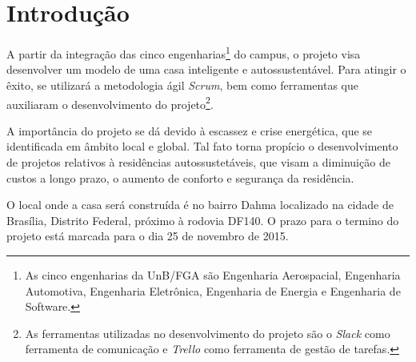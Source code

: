 \chapter[Introdução]{Introdução}

	A partir da integração das cinco engenharias\footnote{As cinco engenharias da UnB/FGA são Engenharia Aerospacial, Engenharia Automotiva, Engenharia Eletrônica, Engenharia de Energia e Engenharia de Software.} do campus, o projeto visa desenvolver um modelo de uma casa inteligente e autossustentável. Para atingir o êxito, se utilizará a metodologia ágil \textit{Scrum}, bem como ferramentas que auxiliaram o desenvolvimento do projeto\footnote{As ferramentas utilizadas no desenvolvimento do projeto são o \textit{Slack} como ferramenta de comunicação e \textit{Trello} como ferramenta de gestão de tarefas.}.

	A importância do projeto se dá devido à escassez e crise energética, que se identificada em âmbito local e global. Tal fato torna propício o desenvolvimento de projetos relativos à residências autossustetáveis, que visam a diminuição de custos a longo prazo, o aumento de conforto e segurança da residência.

	O local onde a casa será construída é no bairro Dahma localizado na cidade de Brasília, Distrito Federal, próximo à rodovia DF140. O prazo para o termino do projeto está marcada para o dia 25 de novembro de 2015. 
